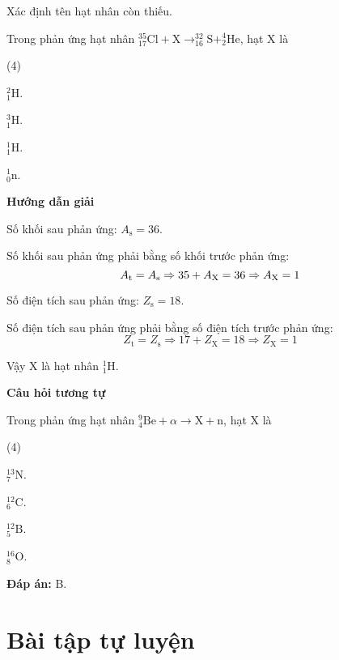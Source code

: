 \begin{dang}{Xác định tên hạt nhân còn thiếu.}
	{
		Trong phản ứng hạt nhân $^{35}_{17} \text{Cl} + \text{X} \longrightarrow ^{32}_{16} \text{S} + ^{4}_{2} \text{He}$, hạt X là
		\begin{mcq}(4)
			\item $^{2}_{1} \text{H}$.
			\item $^{3}_{1} \text{H}$. 
			\item $^{1}_{1} \text{H}$. 
			\item $^{1}_{0} \text{n}$.
		\end{mcq}
	}
	{
		\begin{center}
			\textbf{Hướng dẫn giải}
		\end{center}
		
		Số khối sau phản ứng: $A_\text{s} = 36$.
		
		Số khối sau phản ứng phải bằng số khối trước phản ứng:
		$$A_\text{t} = A_\text{s} \Rightarrow 35+A_\text X = 36 \Rightarrow A_\text X = 1$$
		
		Số điện tích sau phản ứng: $Z_\text{s} = 18$.
		
		Số điện tích sau phản ứng phải bằng số điện tích trước phản ứng:
		$$Z_\text{t} = Z_\text{s} \Rightarrow 17 + Z_\text{X} = 18 \Rightarrow Z_\text{X} = 1$$
		
		Vậy X là hạt nhân $^{1}_{1} \text{H}$.
		
		\begin{center}
			\textbf{Câu hỏi tương tự}
		\end{center}
		
		Trong phản ứng hạt nhân $^{9}_{4} \text{Be} + \alpha \longrightarrow \text{X} + \text{n}$, hạt X là
		\begin{mcq}(4)
			\item $^{13}_{7} \text{N}$.
			\item $^{12}_{6} \text{C}$.
			\item $^{12}_{5} \text{B}$. 
			\item $^{16}_{8} \text{O}$.
		\end{mcq}
		\textbf{Đáp án:} B.
	}
	
\end{dang}
\section{Bài tập tự luyện}



